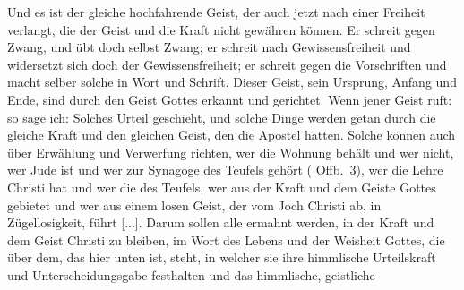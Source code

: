 {    Und es ist der gleiche hochfahrende Geist, der auch jetzt nach
    einer Freiheit verlangt, die der Geist und die Kraft nicht gewähren
    können. Er schreit gegen Zwang, und übt doch selbst Zwang; er
    schreit nach Gewissensfreiheit und 
    widersetzt sich doch der Gewissensfreiheit; er schreit gegen 
    die Vorschriften und macht selber solche
    in Wort und Schrift. Dieser Geist, sein Ursprung, Anfang und
    Ende, sind durch den Geist Gottes erkannt und gerichtet. Wenn
    jener Geist ruft: 
     so sage ich:  Solches
    Urteil geschieht, und solche Dinge werden getan durch die gleiche
    Kraft und den gleichen Geist, den die Apostel hatten. Solche
    können auch über Erwählung und Verwerfung
     richten, wer die
    Wohnung behält und wer nicht, wer Jude ist und wer zur
    Synagoge des Teufels gehört (
    Offb.~3), wer die Lehre Christi hat
    und wer die des Teufels, wer aus der Kraft und dem Geiste Gottes
    gebietet und wer aus einem losen Geist, der vom Joch Christi
    ab, in Zügellosigkeit, führt [...]. Darum sollen alle ermahnt
    werden, in der Kraft und dem Geist Christi zu bleiben, im Wort
    des Lebens und der Weisheit Gottes, die über dem, das hier
    unten ist, steht, in welcher sie ihre himmlische Urteilskraft
    und Unterscheidungsgabe festhalten und das himmlische, geistliche 
}
